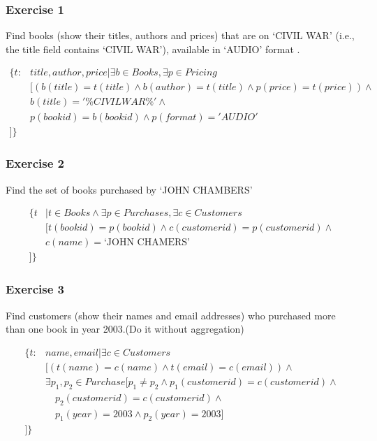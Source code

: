 \documentclass{beamer}
\begin{document}
\begin{frame}[fragile]
  \frametitle{Exercise 1}
  Find books (show their titles, authors and prices) that are on `CIVIL WAR' (i.e., the title field contains `CIVIL WAR'), available in `AUDIO' format \footnotemark {}. 

\begin{align*}
\{t: &title, author, price| \exists b \in Books, \exists p \in Pricing \\
&[(b(title)=t(title)\wedge b(author)=t(title) \wedge p(price)=t(price)) \wedge \\
& b(title)='\%CIVIL WAR\%' \wedge \\
& p(bookid)=b(bookid) \wedge p(format)='AUDIO'\\
]\}
\end{align*}
\end{frame}

\begin{frame}[fragile]
\frametitle{Exercise 2}
Find the set of books purchased by  `JOHN CHAMBERS'

\begin{align*}
\{t&|t\in Books\wedge \exists p \in Purchases, \exists c \in Customers \\
&[t(bookid)=p(bookid) \wedge c(customerid)=p(customerid) \wedge \\
&c(name)=\text{`JOHN CHAMERS'}\\
]\}
\end{align*}


\end{frame}

\begin{frame}[fragile]
\frametitle{Exercise 3}
Find customers (show their names and email addresses) who purchased more than one book in year 2003.(Do it without aggregation) 

\begin{align*}
\{t: &name, email| \exists c \in Customers \\
&[(t(name)=c(name)\wedge t(email)=c(email)) \wedge \\
& \exists p_1,p_2 \in Purchase [p_1\neq p_2 \wedge p_1(customerid)=c(customerid) \wedge \\ 
&\quad p_2(customerid)=c(customerid) \wedge \\
&\quad p_1(year)=2003 \wedge p_2(year)=2003]\\
]\}
\end{align*}
\end{frame}
\end{document}

